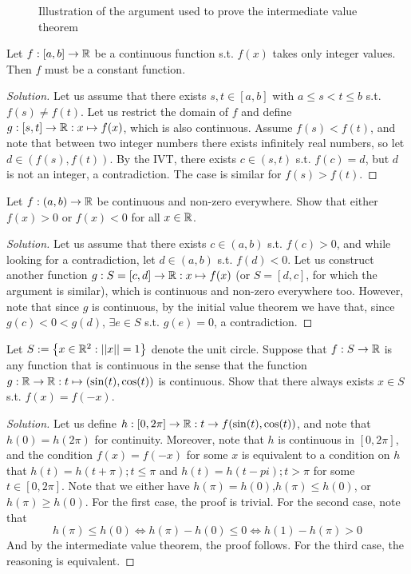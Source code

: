 \begin{figure}[ht]
    \centering
    \caption{Illustration of the argument used to prove the intermediate value theorem}
    \label{fig:ivt-proof}
\end{figure}
\begin{example}
  Let $f:[a,b]\to\mathbb R$ be a continuous function s.t. $f(x)$ takes only integer values. Then
  $f$ must be a constant function.
\end{example}
\begin{proof}[Solution]
  Let us assume that there exists $s,t\in[a,b]$ with $a\leq s<t\leq b$ s.t. $f(s)\neq
  f(t)$. Let us restrict the domain of $f$ and define $g:[s,t]\to\mathbb R:x\mapsto f(x)$, which
  is also continuous. Assume $f(s)<f(t)$, and note that between two integer numbers there
  exists infinitely real numbers, so let $d\in(f(s),f(t))$. By the IVT, there exists
  $c\in(s,t)$ s.t. $f(c)=d$, but $d$ is not an integer, a contradiction. The case is
  similar for $f(s)>f(t)$. 
\end{proof}
\begin{example}
  Let $f:(a,b)\to\mathbb R$ be continuous and non-zero everywhere. Show that either $f(x)>0$ or
  $f(x)<0$ for all $x\in\mathbb R$.
\end{example}
\begin{proof}[Solution]
  Let us assume that there exists $c\in(a,b)$ s.t. $f(c)>0$, and while looking for a
  contradiction, let $d\in(a,b)$ s.t. $f(d)<0$. Let us construct another function
  $g:S=[c,d]\to\mathbb R:x\mapsto f(x)$ (or $S=[d,c]$, for which the argument is similar), which
  is continuous and non-zero everywhere too. However, note that since $g$ is continuous,
  by the initial value theorem we have that, since $g(c)<0<g(d)$, $\exists e\in S$ s.t.
  $g(e)=0$, a contradiction. 
\end{proof}
\begin{example}
  Let $S:=\left\{ x\in\mathbb R^2 :||x||=1 \right\}$ denote the unit circle. Suppose that
  $f:S\to\mathbb R$ is any function that is continuous in the sense that the function
  $g:\mathbb R\to\mathbb R:t\mapsto (\sin(t),\cos(t))$ is continuous. Show that there always exists
  $x\in S$ s.t. $f(x)=f(-x)$.
\end{example}
\begin{proof}[Solution]
  Let us define $h:[0,2\pi]\to\mathbb R:t\to f(\sin(t),\cos(t))$, and note that $h(0)=h(2\pi)$
  for continuity. Moreover, note that $h$ is continuous in $[0,2\pi ]$, and the condition
  $f(x)=f(-x)$ for some $x$ is equivalent to a condition on $h$ that $h(t)=h(t+\pi);t\leq\pi$ and
  $h(t)=h(t-pi);t>\pi$ for some $t\in [0,2\pi ]$. Note that we either have
  $h(\pi)=h(0)$,$h(\pi)\leq h(0)$, or $h(\pi)\geq h(0)$. For the first case, the proof is trivial.
  For the second case, note that 
  \[h(\pi)\leq h(0) \iff h(\pi)-h(0)\leq 0 \iff h(1)-h(\pi)>0\]
  And by the intermediate value theorem, the proof follows. For the third case, the
  reasoning is equivalent.
\end{proof}
